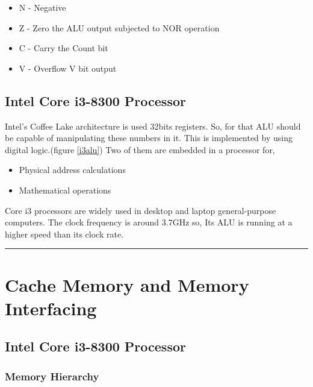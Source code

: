 \documentclass[a4paper,11pt]{article}
\begin{document}
\begin{itemize}
	\item 	N - Negative
\item	Z - Zero the ALU output subjected to NOR operation
\item 	C - Carry the Count bit
\item	V - Overflow V bit output
\end{itemize}

\subsection{Intel Core i3-8300 Processor}

Intel's Coffee Lake architecture is used 32bits registers. So, for that ALU should be capable of manipulating these numbers in it. This is implemented by using digital logic.(figure \ref{i3alu}) Two of them are embedded in a processor for,
\begin{itemize}
	\item 	Physical address calculations
	\item	Mathematical operations

\end{itemize}

Core i3 processors are widely used in desktop and laptop general-purpose computers. The clock frequency is around 3.7GHz so, Its ALU is running at a higher speed than its clock rate.




\vspace{1cm}\hrule
\section{Cache Memory and Memory Interfacing}

\subsection{Intel Core i3-8300 Processor}

\subsubsection{Memory Hierarchy}
\end{document}
